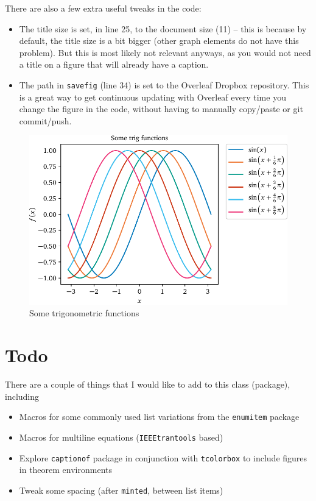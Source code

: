 \documentclass[letterpaper,11pt]{notes}
\theoremstyle{definition}
\theoremstyle{plain}
\theoremstyle{remark}
\begin{document}
There are also a few extra useful tweaks in the code:
\begin{itemize}
    \item The title size is set, in line 25, to the document size (11) -- this is because by default, the title size is a bit bigger (other graph elements do not have this problem). But this is most likely not relevant anyways, as you would not need a title on a figure that will already have a caption.
    \item The path in \texttt{savefig} (line 34) is set to the Overleaf Dropbox repository. This is a great way to get continuous updating with Overleaf every time you change the figure in the code, without having to manually copy/paste or git commit/push.
\end{itemize}

\begin{figure}
    \centering
    \includegraphics{trig.pdf}
    \caption{Some trigonometric functions}
    \label{fig:trig}
\end{figure}

\section{Todo}
There are a couple of things that I would like to add to this class (package), including
\begin{itemize}
    \item Macros for some commonly used list variations from the \texttt{enumitem} package
    \item Macros for multiline equations (\texttt{IEEEtrantools} based)
    \item Explore \texttt{captionof} package in conjunction with \texttt{tcolorbox} to include figures in theorem environments
    \item Tweak some spacing (after \texttt{minted}, between list items)
\end{itemize}
\end{document}
